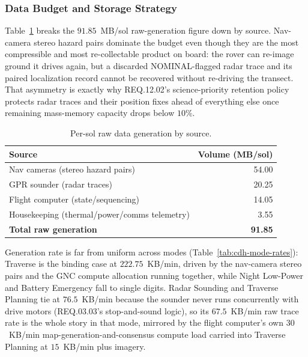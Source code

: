 \documentclass[11pt]{article}
\begin{document}
\subsubsection{Data Budget and Storage Strategy}
Table~\ref{tab:cdh-data-budget} breaks the $91.85$~MB/sol raw-generation figure down by source.
Nav-camera stereo hazard pairs dominate the budget even though they are the most compressible and
most re-collectable product on board: the rover can re-image ground it drives again, but a
discarded NOMINAL-flagged radar trace and its paired localization record cannot be recovered
without re-driving the transect. That asymmetry is exactly why REQ.12.02's science-priority
retention policy protects radar traces and their position fixes ahead of everything else once
remaining mass-memory capacity drops below $10\%$.

\begin{table}[H]
\centering
\small
\begin{tabular}{lr}
\toprule
\textbf{Source} & \textbf{Volume (MB/sol)} \\
\midrule
Nav cameras (stereo hazard pairs) & 54.00 \\
GPR sounder (radar traces) & 20.25 \\
Flight computer (state/sequencing) & 14.05 \\
Housekeeping (thermal/power/comms telemetry) & 3.55 \\
\midrule
\textbf{Total raw generation} & \textbf{91.85} \\
\bottomrule
\end{tabular}
\caption{Per-sol raw data generation by source.}
\label{tab:cdh-data-budget}
\end{table}

Generation rate is far from uniform across modes (Table~\ref{tab:cdh-mode-rates}): Traverse is the
binding case at $222.75$~KB/min, driven by the nav-camera stereo pairs and the GNC compute
allocation running together, while Night Low-Power and Battery Emergency fall to single digits.
Radar Sounding and Traverse Planning tie at $76.5$~KB/min because the sounder never runs
concurrently with drive motors (REQ.03.03's stop-and-sound logic), so its $67.5$~KB/min raw trace
rate is the whole story in that mode, mirrored by the flight computer's own $30$~KB/min
map-generation-and-consensus compute load carried into Traverse Planning at $15$~KB/min plus
imagery.
\end{document}
